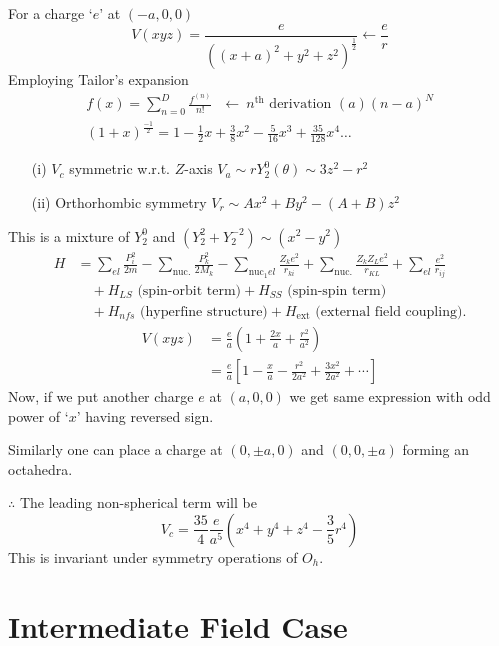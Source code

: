 For a charge `$e$' at $(-a,0,0)$
$$
V(xyz)=\dfrac{e}{((x+a)^{2}+y^{2}+z^{2})^{\frac{1}{2}}}\leftarrow \frac{e}{r}
$$
Employing Tailor's expansion 
\begin{gather*}
f(x)=\sum\limits^{D}_{n=0}\frac{f^{(n)}}{n!}\text{~ $\leftarrow \ n^{\text{th}}$ derivation } (a)(n-a)^{N}\\
(1+x)^{\frac{-1}{2}}=1-\frac{1}{2}x+\frac{3}{8}x^{2}-\frac{5}{16}x^{3}+\frac{35}{128}x^{4}\ldots
\end{gather*}
\begin{itemize}
\item[(i)] $V_{c}$ symmetric w.r.t. $Z$-axis $V_{a}\sim rY^{0}_{2}(\theta)\sim 3z^{2}-r^{2}$

\item[(ii)] Orthorhombic symmetry $V_{r}\sim Ax^{2}+By^{2}-(A+B)z^{2}$
\end{itemize}
This is a mixture of $Y^{0}_{2}$ and $(Y^{2}_{2}+Y^{-2}_{2})\sim (x^{2}-y^{2})$ 
\begin{align*}
H &= \sum\limits_{el}\frac{P^{2}_{i}}{2m}-\sum\limits_{\text{nuc.}}\frac{P^{2}_{k}}{2M_{k}}-\sum\limits_{\text{nuc}_{1}el}\frac{Z_{k}e^{2}}{r_{ki}}+\sum\limits_{\text{nuc.}}\frac{Z_{k}Z_{L}e^{2}}{r_{KL}}+\sum\limits_{el}\frac{e^{2}}{r_{ij}}\\
&\quad +H_{LS}\text{ (spin-orbit term)} + H_{SS}\text{ (spin-spin term)}\\
&\quad +H_{nfs}\text{ (hyperfine structure)}+H_{\text{ext}}\text{ (external field coupling)}.
\end{align*}
\begin{align*}
V(xyz) &= \frac{e}{a}\left(1+\frac{2x}{a}+\frac{r^{2}}{a^{2}}\right)\\
&= \frac{e}{a}\left[1-\frac{x}{a}-\frac{r^{2}}{2a^{2}}+\frac{3x^{2}}{2a^{2}}+\cdots\right]
\end{align*}
Now, if we put another charge $e$ at $(a,0,0)$ we get same expression with odd power of `$x$' having reversed sign.

Similarly one can place a charge at $(0,\pm a,0)$ and $(0,0,\pm a)$ forming an octahedra.

$\therefore$ The leading non-spherical term will be
$$
V_{c}=\frac{35}{4}\frac{e}{a^{5}}\left(x^{4}+y^{4}+z^{4}-\frac{3}{5}r^{4}\right)
$$
This is invariant under symmetry operations of $O_{h}$.

\section*{Intermediate Field Case}

